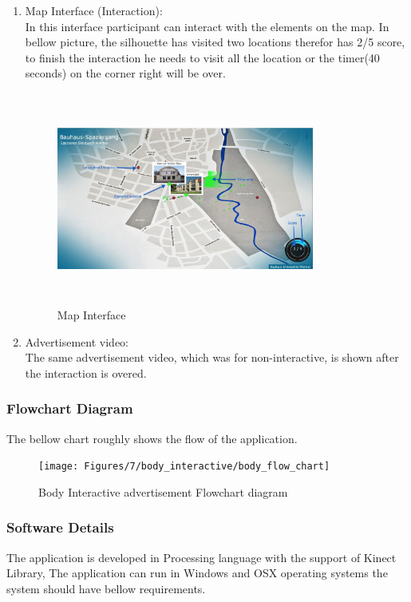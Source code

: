 \begin{enumerate}
\item Map Interface (Interaction): \\
In this interface participant can interact with the elements on the map. In bellow picture, the silhouette has visited two locations therefor has 2/5 score, to finish the interaction he needs to visit all the location or the timer(40 seconds) on the corner right will be over.\begin{figure}[H]
    \centering
    \includegraphics[width=0.8\textwidth,height=70mm]{Figures/7/body_interactive/second_interface}
    \caption{Map Interface}%
    \label{fig:body_secondinterface}%
\end{figure}

\item Advertisement video:\\
The same advertisement video, which was for non-interactive, is shown after the interaction is overed.

\end{enumerate}

\iffalse
\subsubsection{Flowchart Diagram}
The bellow chart roughly shows the flow of the application.
\begin{figure}[H]
    \centering
    \texttt{[image: Figures/7/body\_interactive/body\_flow\_chart]}
    \caption{Body Interactive advertisement Flowchart diagram}%
    \label{fig:Body_flowchat}%
\end{figure}


\subsubsection{Software Details}
The application is developed in Processing language with the support of Kinect Library, The application can run in Windows and OSX operating systems the system should have bellow requirements.

